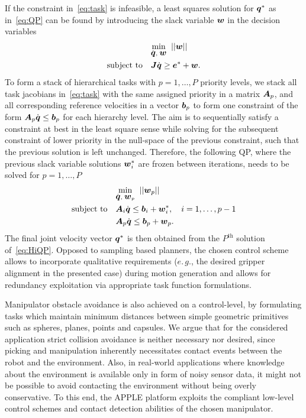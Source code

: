 If the constraint in~\eqref{eq:task} is infeasible, a least squares solution for $\mbox{\boldmath $q$}^*$ as
in~\eqref{eq:QP} can be found by introducing the slack variable $\mbox{\boldmath $w$}$ in the decision variables
%
\begin{align}\label{eq:iQP}
  &\underset{\dot{\mbox{\boldmath $q$}},\;\mbox{\boldmath $w$}}{\mbox{min}}\;\;||\mbox{\boldmath $w$}||\\
   \mbox{subject to} \quad &\mbox{\boldmath $J$}\dot{\mbox{\boldmath $q$}} \geq \mbox{\boldmath $e$}^* + \mbox{\boldmath $w$}. \nonumber
\end{align}
%
To form a stack of hierarchical tasks with $p=1,\dots,P$ priority levels, we stack all task
jacobians in~\eqref{eq:task} with the same assigned priority in a matrix $\mbox{\boldmath $A$}_p$, and all
corresponding reference velocities in a vector $\mbox{\boldmath $b$}_p$ to form one constraint of the form
$\mbox{\boldmath $A$}_p\dot{\mbox{\boldmath $q$}}\leq \mbox{\boldmath $b$}_p$ for each hierarchy level. The aim is to sequentially satisfy
a constraint at best in the least square sense while solving for the subsequent constraint of lower
priority in the null-space of the previous constraint, such that the previous solution is left
unchanged. Therefore, the following QP, where the previous slack variable solutions $\mbox{\boldmath $w$}_i^*$
are frozen between iterations, needs to be solved for $p=1,\ldots,P$
%
\begin{align}\label{eq:HiQP}
  &\underset{\dot{\mbox{\boldmath $q$}},\;\mbox{\boldmath $w$}_p}{\mbox{min}}\;\;||\mbox{\boldmath $w$}_p||\\
   \mbox{subject to} \quad &\mbox{\boldmath $A$}_i\dot{\mbox{\boldmath $q$}} \leq \mbox{\boldmath $b$}_i + \mbox{\boldmath $w$}_i^*, \quad i=1,\dots,p-1 \nonumber \\
                           &\mbox{\boldmath $A$}_p\dot{\mbox{\boldmath $q$}} \leq \mbox{\boldmath $b$}_p + \mbox{\boldmath $w$}_p.  \nonumber 
\end{align}
%
The final joint velocity vector $\mbox{\boldmath $q$}^*$ is then obtained from the $P^{\mbox{th}}$ solution
of~\eqref{eq:HiQP}. Opposed to sampling based planners, the chosen control scheme allows to
incorporate qualitative requirements ($e.\,g.$, the desired gripper alignment in the presented case)
during motion generation and allows for redundancy exploitation via appropriate task function
formulations.

Manipulator obstacle avoidance is also achieved on a control-level, by formulating tasks which
maintain minimum distances between simple geometric primitives such as spheres, planes, points and
capsules. We argue that for the considered application strict collision avoidance is neither
necessary nor desired, since picking and manipulation inherently necessitates contact events between
the robot and the environment. Also, in real-world applications where knowledge about the
environment is available only in form of noisy sensor data, it might not be possible to avoid
contacting the environment without being overly conservative. To this end, the APPLE platform
exploits the compliant low-level control schemes and contact detection abilities of the chosen
manipulator.
%
